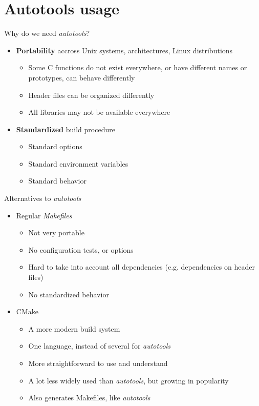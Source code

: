 \section{Autotools usage}

\begin{frame}{Why do we need {\em autotools}?}
  \begin{itemize}
  \item {\bf Portability} accross Unix systems, architectures, Linux
    distributions
    \begin{itemize}
    \item Some C functions do not exist everywhere, or have different
      names or prototypes, can behave differently
    \item Header files can be organized differently
    \item All libraries may not be available everywhere
    \end{itemize}
  \item {\bf Standardized} build procedure
    \begin{itemize}
    \item Standard options
    \item Standard environment variables
    \item Standard behavior
    \end{itemize}
  \end{itemize}
\end{frame}

\begin{frame}{Alternatives to {\em autotools}}
  \begin{itemize}
  \item Regular {\em Makefiles}
    \begin{itemize}
    \item Not very portable
    \item No configuration tests, or options
    \item Hard to take into account all dependencies (e.g. dependencies
      on header files)
    \item No standardized behavior
    \end{itemize}
  \item CMake
    \begin{itemize}
    \item A more modern build system
    \item One language, instead of several for {\em autotools}
    \item More straightforward to use and understand
    \item A lot less widely used than {\em autotools}, but growing in
      popularity
    \item Also generates Makefiles, like {\em autotools}
    \end{itemize}
  \end{itemize}
\end{frame}

